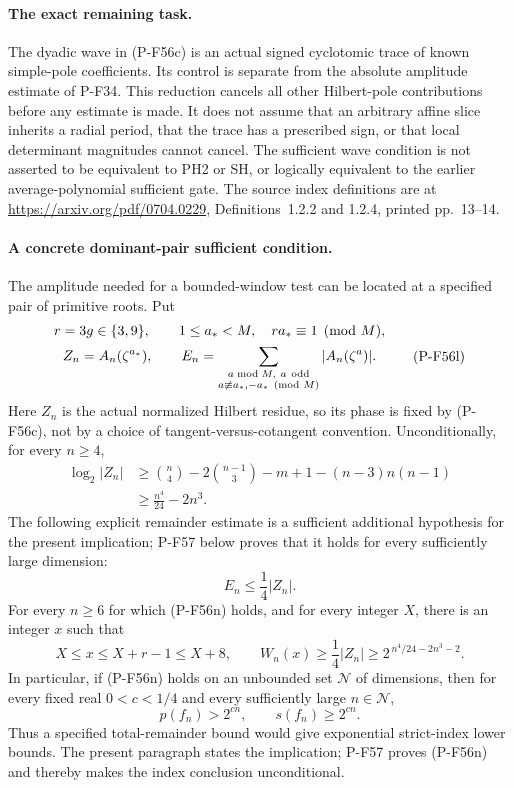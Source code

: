 \paragraph{The exact remaining task.}
The dyadic wave in (P-F56c) is an actual signed cyclotomic
trace of known simple-pole coefficients. Its control is
separate from the absolute amplitude estimate of P-F34.
This reduction cancels all other Hilbert-pole contributions
before any estimate is made. It does not assume that an
arbitrary affine slice inherits a radial period, that the
trace has a prescribed sign, or that local determinant
magnitudes cannot cancel. The sufficient wave condition
is not asserted to be equivalent to PH2 or SH, or logically
equivalent to the earlier average-polynomial sufficient gate.
The source index definitions are at
\url{https://arxiv.org/pdf/0704.0229},
Definitions~1.2.2 and 1.2.4, printed pp.~13--14.

\paragraph{A concrete dominant-pair sufficient condition.}
The amplitude needed for a bounded-window test can be located at a
specified pair of primitive roots. Put
\[
 \begin{gathered}
 r=3g\in\{3,9\},\qquad
 1\le a_*<M,\quad ra_*\equiv1\pmod M,\\
 Z_n=A_n(\zeta^{a_*}),\qquad
 E_n=\sum_{\substack{a\bmod M,\ a\ {\rm odd}\\
                         a\not\equiv a_*,-a_*\pmod M}}
                              |A_n(\zeta^a)|.
 \end{gathered}
 \tag{P-F56l}
\]
Here $Z_n$ is the actual normalized Hilbert residue, so its phase
is fixed by (P-F56c), not by a choice of tangent-versus-cotangent
convention. Unconditionally, for every $n\ge4$,
\[
 \begin{split}
 \log_2|Z_n|
 &\ge \binom n4-2\binom{n-1}3-m+1-(n-3)n(n-1)\\
 &\ge \frac{n^4}{24}-2n^3.
 \end{split}
 \tag{P-F56m}
\]
The following explicit remainder estimate is a sufficient
additional hypothesis for the present implication; P-F57 below
proves that it holds for every sufficiently large dimension:
\[
                         E_n\le\frac14|Z_n|.
 \tag{P-F56n}
\]
For every $n\ge6$ for which (P-F56n) holds, and for every integer
$X$, there is an integer $x$ such that
\[
 X\le x\le X+r-1\le X+8,\qquad
 W_n(x)\ge\frac14|Z_n|
             \ge 2^{\,n^4/24-2n^3-2}.
 \tag{P-F56o}
\]
In particular, if (P-F56n) holds on an unbounded set
$\mathcal N$ of dimensions, then for every fixed real
$0<c<1/4$ and every sufficiently large $n\in\mathcal N$,
\[
                      p(f_n)>2^{cn},
             \qquad  s(f_n)\ge2^{cn}.
 \tag{P-F56p}
\]
Thus a specified total-remainder bound would give exponential
strict-index lower bounds. The present paragraph states the implication; P-F57 proves
(P-F56n) and thereby makes the index conclusion unconditional.

